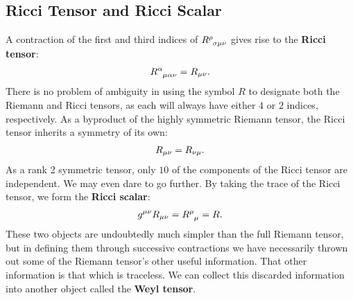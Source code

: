 \documentclass[10pt]{article}
\begin{document}
    \subsection{Ricci Tensor and Ricci Scalar}
    A contraction of the first and third indices of $\tensor{R}{^\rho_\sigma_\mu_\nu}$ gives rise to the \textbf{Ricci tensor}:
    \begin{align}
    	\tensor{R}{^\alpha_\mu_\alpha_\nu} = R_{\mu\nu}	\label{eq:ricci_tensor} .
    \end{align}
    There is no problem of ambiguity in using the symbol $R$ to designate both the Riemann and Ricci tensors, as each will always have either $4$ or $2$ indices, respectively. As a byproduct of the highly symmetric Riemann tensor, the Ricci tensor inherits a symmetry of its own:
    \begin{align}
    	 R_{\mu\nu} = R_{\nu\mu} \notag. 
    \end{align}
    As a rank 2 symmetric tensor, only $10$ of the components of the Ricci tensor are independent. We may even dare to go further. By taking the trace of the Ricci tensor, we form the \textbf{Ricci scalar}:
    \begin{align}
    	 g^{\mu\nu}R_{\mu\nu} = \tensor{R}{^\mu_\mu} = R \label{eq:ricci_scalar} . 
    \end{align}
    These two objects are undoubtedly much simpler than the full Riemann tensor, but in defining them through successive contractions we have necessarily thrown out some of the Riemann tensor's other useful information. That other information is that which is traceless. We can collect this discarded information into another object called the \textbf{Weyl tensor}.
\end{document}

